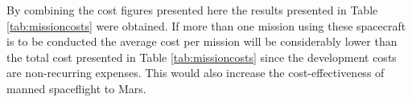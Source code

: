 By combining the cost figures presented here the results presented in Table \ref{tab:missioncosts} were obtained. If more than one mission using these spacecraft is to be conducted the average cost per mission will be considerably lower than the total cost presented in Table \ref{tab:missioncosts} since the development costs are non-recurring expenses. This would also increase the cost-effectiveness of manned spaceflight to Mars.